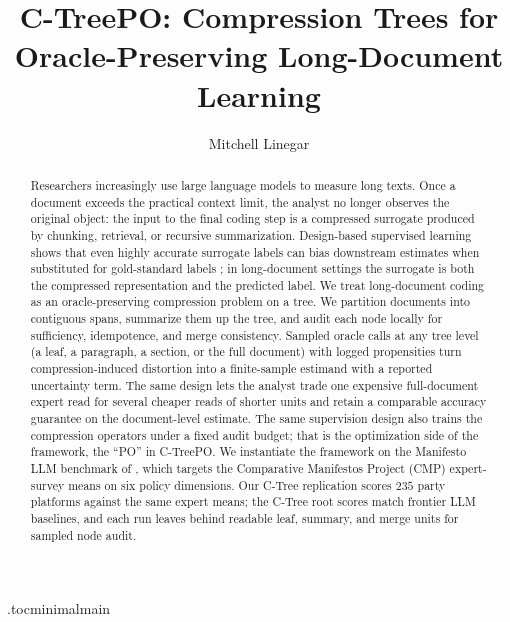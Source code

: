 \documentclass[11pt]{article}
\title{C-TreePO: Compression Trees for Oracle-Preserving Long-Document Learning}
\author{Mitchell Linegar}
\date{}
\begin{document}
\maketitle

\begin{abstract}
Researchers increasingly use large language models to measure long
texts. Once a document exceeds the practical context limit, the
analyst no longer observes the original object: the input to the
final coding step is a compressed surrogate produced by chunking,
retrieval, or recursive summarization. Design-based supervised
learning shows that even highly accurate surrogate labels can bias
downstream estimates when substituted for gold-standard labels
\citep{EgamiEtAl2024}; in long-document settings the surrogate is
both the compressed representation and the predicted label. We treat
long-document coding as an oracle-preserving compression problem on
a tree. We partition documents into contiguous spans, summarize them
up the tree, and audit each node locally for sufficiency,
idempotence, and merge consistency. Sampled oracle calls at any tree
level (a leaf, a paragraph, a section, or the full document) with
logged propensities turn compression-induced distortion into a
finite-sample estimand with a reported uncertainty term. The same
design lets the analyst trade one expensive full-document expert
read for several cheaper reads of shorter units and retain a
comparable accuracy guarantee on the document-level estimate. The
same supervision design also trains the compression operators under a
fixed audit budget; that is the optimization side of the framework,
the ``PO'' in C-TreePO. We instantiate the framework on the
Manifesto LLM benchmark of \citet{BenoitEtAl2025}, which targets the
Comparative Manifestos Project (CMP) expert-survey means on six
policy dimensions. Our C-Tree replication scores \(235\) party
platforms against the same expert means; the C-Tree root scores
match frontier LLM baselines, and each run leaves behind readable
leaf, summary, and merge units for sampled node audit.
\end{abstract}

\tableofcontents
\clearpage

\etocdepthtag.toc{minimalmain}






\clearpage


\end{document}
